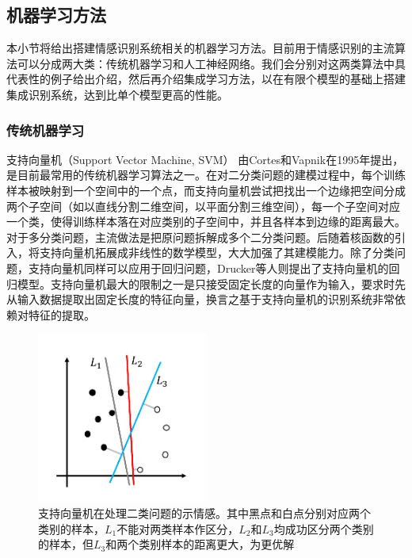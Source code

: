 \subsection{机器学习方法}
\label{ssec:model}

本小节将给出搭建情感识别系统相关的机器学习方法。目前用于情感识别的主流算法可以分成两大类：传统机器学习和人工神经网络。我们会分别对这两类算法中具代表性的例子给出介绍，然后再介绍集成学习方法，以在有限个模型的基础上搭建集成识别系统，达到比单个模型更高的性能。

\subsubsection{传统机器学习}

支持向量机（Support Vector Machine, SVM）\cite{cortes1995support} 由Cortes和Vapnik在1995年提出，是目前最常用的传统机器学习算法之一。在对二分类问题的建模过程中，每个训练样本被映射到一个空间中的一个点，而支持向量机尝试把找出一个边缘把空间分成两个子空间（如以直线分割二维空间，以平面分割三维空间），每一个子空间对应一个类，使得训练样本落在对应类别的子空间中，并且各样本到边缘的距离最大。对于多分类问题，主流做法是把原问题拆解成多个二分类问题。后随着核函数的引入，将支持向量机拓展成非线性的数学模型，大大加强了其建模能力。除了分类问题，支持向量机同样可以应用于回归问题，Drucker等人\cite{drucker1997support}则提出了支持向量机的回归模型。支持向量机最大的限制之一是只接受固定长度的向量作为输入，要求时先从输入数据提取出固定长度的特征向量，换言之基于支持向量机的识别系统非常依赖对特征的提取。

\begin{figure}[H]
  \centering
  \includegraphics[width=0.5\textwidth]{img/svm.pdf}
  \caption{支持向量机在处理二类问题的示情感。其中黑点和白点分别对应两个类别的样本，$L_1$不能对两类样本作区分，$L_2$和$L_3$均成功区分两个类别的样本，但$L_3$和两个类别样本的距离更大，为更优解}
  \label{fig:svm}
\end{figure}

